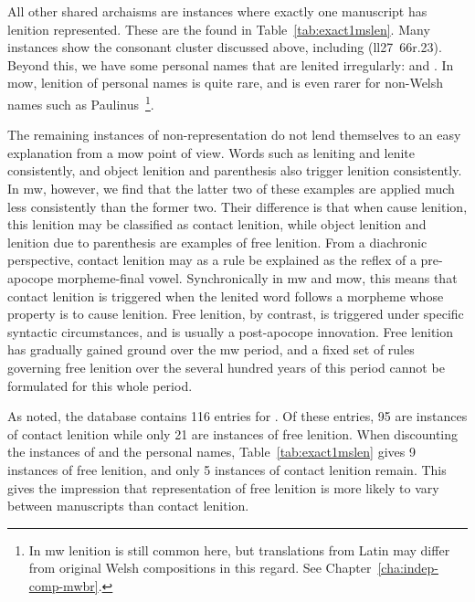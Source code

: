 All other shared archaisms are instances where exactly one manuscript has lenition represented. These are the found in Table~\ref{tab:exact1mslen}. Many instances show the consonant cluster  discussed above, including  (\gls{ll27}~66r.23). Beyond this, we have some personal names that are lenited irregularly:  and  . In \gls{mow}, lenition of personal names is quite rare, and is even rarer for non-Welsh names such as Paulinus~\autocite[702]{thomas_gramadeg_1996}\footnote{In \gls{mw} lenition is still common here, but translations from Latin may differ from original Welsh compositions in this regard. See Chapter~\ref{cha:indep-comp-mwbr}.}. 

The remaining instances of non-representation do not lend themselves to an easy explanation from a \gls{mow} point of view. Words such as leniting  and  lenite  consistently, and object lenition and parenthesis also trigger lenition consistently. In \gls{mw}, however, we find that the latter two of these examples are applied much less consistently than the former two. Their difference is that when  cause lenition, this lenition may be classified as contact lenition, while object lenition and lenition due to parenthesis are examples of free lenition. From a diachronic perspective, contact lenition may as a rule be explained as the reflex of a pre-apocope morpheme-final vowel. Synchronically in \gls{mw} and \gls{mow}, this means that contact lenition is triggered when the lenited word follows a morpheme whose property is to cause lenition. Free lenition, by contrast, is triggered under specific syntactic circumstances, and is usually a post-apocope innovation. Free lenition has gradually gained ground over the \gls{mw} period, and a fixed set of rules governing free lenition over the several hundred years of this period cannot be formulated for this whole period. 

As noted, the database contains  116 entries for . Of these entries, 95 are instances of contact lenition while only 21 are instances of free lenition. When discounting the instances of  and the personal names, Table~\ref{tab:exact1mslen} gives 9 instances of free lenition, and only 5 instances of contact lenition remain. This gives the impression that representation of free lenition is more likely to vary between manuscripts than contact lenition.

